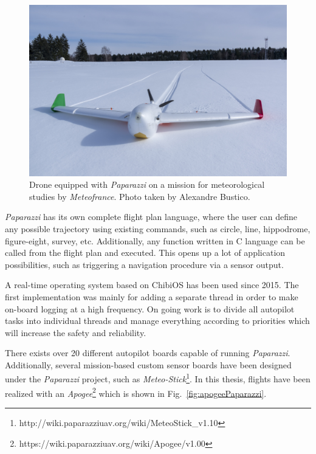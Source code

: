 \begin{figure}
\begin{center}
\includegraphics[width=13cm]{figures/snowWhiteJPG}
\caption{Drone equipped with \emph{Paparazzi} on a mission for meteorological studies by \emph{Meteofrance}. Photo taken by Alexandre Bustico.} 
\label{fig:snowWhite}
\end{center}
\end{figure}


\emph{Paparazzi} has its own complete flight plan language, where the user can define any possible trajectory using existing commands, such as circle, line, hippodrome, figure-eight, survey, etc. 
Additionally, any function written in C language can be called from the flight plan and executed. 
This opens up a lot of application possibilities, such as triggering a navigation procedure via a sensor output.

A real-time operating system based on ChibiOS has been used since 2015. 
The first implementation was mainly for adding a separate thread in order to make on-board logging at a high frequency. 
On going work is to divide all autopilot tasks into individual threads and manage everything according to priorities which will increase the safety and reliability.

There exists over 20 different autopilot boards capable of running \emph{Paparazzi}. Additionally, several mission-based custom sensor boards have been designed under the \emph{Paparazzi} project, such as \emph{Meteo-Stick}\footnote{http://wiki.paparazziuav.org/wiki/MeteoStick\_v1.10}. 
In this thesis, flights have been realized with an \emph{Apogee}\footnote{https://wiki.paparazziuav.org/wiki/Apogee/v1.00} which is shown in Fig.~\ref{fig:apogeePaparazzi}.


